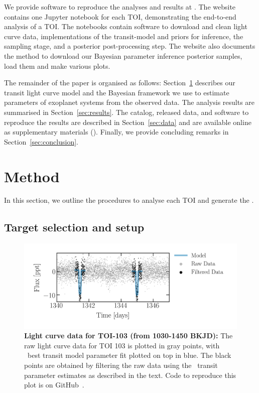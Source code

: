 \documentclass[floatfix,ApJL,twocolumn]{aastex631}
\begin{document}
We provide software to reproduce the analyses and results at \atlasUrl.
The website contains one Jupyter notebook for each TOI, demonstrating the end-to-end analysis of a TOI.
The notebooks contain software to download and clean light curve data, implementations of the transit-model and priors for inference, the \pymc sampling stage, and a posterior post-processing step.
The website also documents the method to download our Bayesian parameter inference posterior samples, load them and make various plots.


The remainder of the paper is organised as follows: Section~\ref{sec:method} describes our transit light curve model and the Bayesian framework we use to estimate parameters of exoplanet systems from the observed data.
The analysis results are summarised in Section~\ref{sec:results}.
The catalog, released data, and software to reproduce the results are described in Section~\ref{sec:data} and are available online as supplementary materials (\atlasUrl).
Finally, we provide concluding remarks in Section~\ref{sec:conclusion}.

\section{Method} \label{sec:method}

In this section, we outline the procedures to analyse each TOI and generate the \tessAtlas. 


\subsection{Target selection and setup }

\begin{figure}
    \includegraphics[width=\linewidth]{figures/raw_data_toi_103.png}
    \caption{\textbf{Light curve data for TOI-103 (from 1030-1450 BKJD):} The raw light curve data for TOI 103 is plotted in gray points, with \exofop\ best transit model parameter fit plotted on top in blue. The black points are obtained by filtering the raw data using the \exofop\ transit parameter estimates as described in the text. Code to reproduce this plot is on GitHub~\paperPlotsLink.}
    \label{fig:}
\end{figure}
\end{document}
